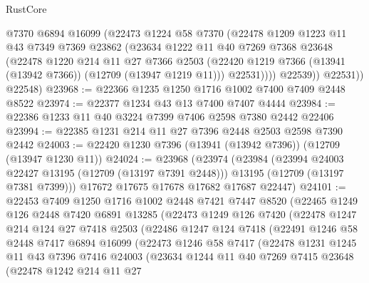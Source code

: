 \begin{lexlean}{RustCore}
\begin{coremodule}
              @7370
              @6894
              @16099
              (@22473
                @1224
                @58
                @7370
                (@22478
                  @1209
                  @1223
                  @11
                  @43
                  @7349
                  @7369
                  @23862
                  (@23634
                    @1222
                    @11
                    @40
                    @7269
                    @7368
                    @23648
                    (@22478
                      @1220
                      @214
                      @11
                      @27
                      @7366
                      @2503
                      (@22420 @1219 @7366 (@13941 (@13942 @7366)) (@12709 (@13947 @1219 @11)))
                      @22531))))
              @22539))
          @22531))
      @22548)
@23968 := @22366 @1235 @1250 @1716 @1002 @7400 @7409 @2448 @8522
@23974 := @22377 @1234 @43 @13 @7400 @7407 @4444
@23984 := @22386 @1233 @11 @40 @3224 @7399 @7406 @2598 @7380 @2442 @22406
@23994 := @22385 @1231 @214 @11 @27 @7396 @2448 @2503 @2598 @7390 @2442
@24003 := @22420 @1230 @7396 (@13941 (@13942 @7396)) (@12709 (@13947 @1230 @11))
@24024 := @23968
    (@23974
      (@23984
        (@23994 @24003 @22427 @13195 (@12709 (@13197 @7391 @2448)))
        @13195
        (@12709 (@13197 @7381 @7399)))
      @17672
      @17675
      @17678
      @17682
      @17687
      @22447)
@24101 := @22453
    @7409
    @1250
    @1716
    @1002
    @2448
    @7421
    @7447
    @8520
    (@22465
      @1249
      @126
      @2448
      @7420
      @6891
      @13285
      (@22473
        @1249
        @126
        @7420
        (@22478
          @1247
          @214
          @124
          @27
          @7418
          @2503
          (@22486
            @1247
            @124
            @7418
            (@22491
              @1246
              @58
              @2448
              @7417
              @6894
              @16099
              (@22473
                @1246
                @58
                @7417
                (@22478
                  @1231
                  @1245
                  @11
                  @43
                  @7396
                  @7416
                  @24003
                  (@23634
                    @1244
                    @11
                    @40
                    @7269
                    @7415
                    @23648
                    (@22478
                      @1242
                      @214
                      @11
                      @27

\end{coremodule}
\end{lexlean}
